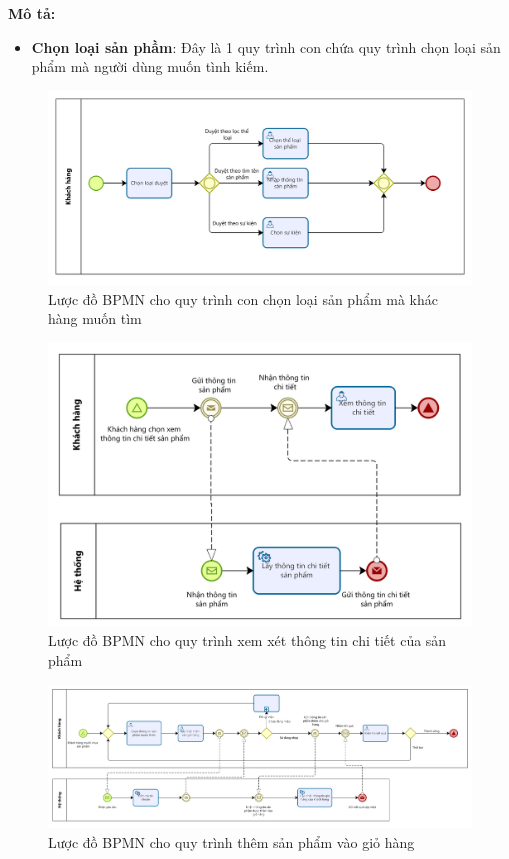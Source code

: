     \textbf{Mô tả:}
    \begin{itemize}
        \item \textbf{Chọn loại sản phầm}: Đây là 1 quy trình con chứa quy trình chọn loại sản phẩm mà người dùng muốn tình kiếm.
    \end{itemize}
    \begin{figure}[!htp]
        \centering
        \includegraphics[width=12cm]{img/BPMN/customer_buy/customer_select_type.png}
        \newline
        \caption{Lược đồ BPMN cho quy trình con chọn loại sản phẩm mà khác hàng muốn tìm}
    \end{figure}
    \begin{figure}[!htp]
        \centering
        \includegraphics[width=12cm]{img/BPMN/customer_buy/customer_product_detail.png}
        \newline
        \caption{Lược đồ BPMN cho quy trình xem xét thông tin chi tiết của sản phẩm}
    \end{figure}
    \begin{figure}[!htp]
        \centering
        \includegraphics[width=17cm]{img/BPMN/customer_buy/customer_add_to_card.png}
        \newline
        \caption{Lược đồ BPMN cho quy trình thêm sản phẩm vào giỏ hàng}
    \end{figure}  
